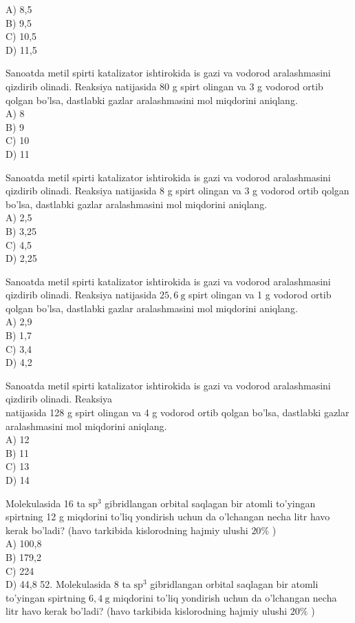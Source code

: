 A) 8,5\\
B) 9,5\\
C) 10,5\\
D) 11,5
  \item Sanoatda metil spirti katalizator ishtirokida is gazi va vodorod aralashmasini qizdirib olinadi. Reaksiya natijasida 80 g spirt olingan va 3 g vodorod ortib qolgan bo'lsa, dastlabki gazlar aralashmasini mol miqdorini aniqlang.\\
A) 8\\
B) 9\\
C) 10\\
D) 11
  \item Sanoatda metil spirti katalizator ishtirokida is gazi va vodorod aralashmasini qizdirib olinadi. Reaksiya natijasida 8 g spirt olingan va 3 g vodorod ortib qolgan bo'lsa, dastlabki gazlar aralashmasini mol miqdorini aniqlang.\\
A) 2,5\\
B) 3,25\\
C) 4,5\\
D) 2,25
  \item Sanoatda metil spirti katalizator ishtirokida is gazi va vodorod aralashmasini qizdirib olinadi. Reaksiya natijasida $25,6 \mathrm{~g}$ spirt olingan va 1 g vodorod ortib qolgan bo'lsa, dastlabki gazlar aralashmasini mol miqdorini aniqlang.\\
A) 2,9\\
B) 1,7\\
C) 3,4\\
D) 4,2
  \item Sanoatda metil spirti katalizator ishtirokida is gazi va vodorod aralashmasini qizdirib olinadi. Reaksiya\\
natijasida 128 g spirt olingan va 4 g vodorod ortib qolgan bo'lsa, dastlabki gazlar aralashmasini mol miqdorini aniqlang.\\
A) 12\\
B) 11\\
C) 13\\
D) 14
  \item Molekulasida 16 ta $\mathrm{sp}^{3}$ gibridlangan orbital saqlagan bir atomli to'yingan spirtning 12 g miqdorini to'liq yondirish uchun da o'lchangan necha litr havo kerak bo'ladi? (havo tarkibida kislorodning hajmiy ulushi $20 \%$ )\\
A) 100,8\\
B) 179,2\\
C) 224\\
D) 44,8
52. Molekulasida 8 ta $\mathrm{sp}^{3}$ gibridlangan orbital saqlagan bir atomli to'yingan spirtning $6,4 \mathrm{~g}$ miqdorini to'liq yondirish uchun da o'lchangan necha litr havo kerak bo'ladi? (havo tarkibida kislorodning hajmiy ulushi $20 \%$ )\\
